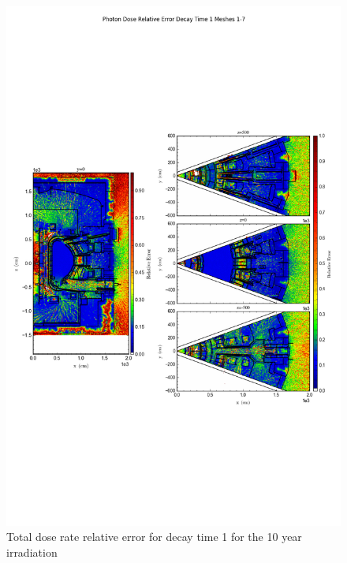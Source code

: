 \documentclass[12pt]{article}
\begin{document}
\begin{figure}[ht!]
\centering
\includegraphics[trim={0cm 8cm, 0cm 8cm},clip,scale=0.75]{../plots/final_model/10year/Photon_Dose_Relative_Error_Decay_Time_1_Meshes_1-7.png}
\caption{Total dose rate relative error for decay time 1 for the 10 year irradiation}
\label{fig:photons_10y_dc1_nob4c_relerr}
\end{figure}
\clearpage
\end{document}
